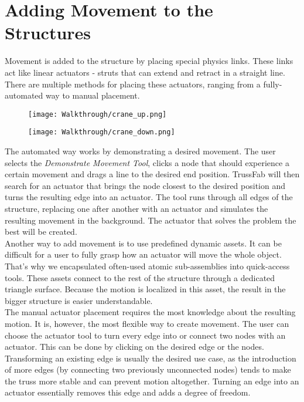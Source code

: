 \section{Adding Movement to the Structures}
Movement is added to the structure by placing special physics links. These links act like linear actuators - struts that can extend and retract in a straight line. There are multiple methods for placing these actuators, ranging from a fully-automated way to manual placement.
\begin{figure}
  \centering
  \begin{minipage}{.5\textwidth}
    \centering
    \texttt{[image: Walkthrough/crane\_up.png]}
    \label{fig:dino_up}
  \end{minipage}%
  \begin{minipage}{.5\textwidth}
    \centering
    \texttt{[image: Walkthrough/crane\_down.png]}
    \label{fig:dino_down}
  \end{minipage}
\end{figure}
The automated way works by demonstrating a desired movement. The user selects the \textit{Demonstrate Movement Tool}, clicks a node that should experience a certain movement and drags a line to the desired end position. TrussFab will then search for an actuator that brings the node closest to the desired position and turns the resulting edge into an actuator. The tool runs through all edges of the structure, replacing one after another with an actuator and simulates the resulting movement in the background. The actuator that solves the problem the best will be created.\\
Another way to add movement is to use predefined dynamic assets. It can be difficult for a user to fully grasp how an actuator will move the whole object. That's why we encapsulated often-used atomic sub-assemblies into quick-access tools. These assets connect to the rest of the structure through a dedicated triangle surface. Because the motion is localized in this asset, the result in the bigger structure is easier understandable.\\
The manual actuator placement requires the most knowledge about the resulting motion. It is, however, the most flexible way to create movement. The user can choose the actuator tool to turn every edge into or connect two nodes with an actuator. This can be done by clicking on the desired edge or the nodes. Transforming an existing edge is usually the desired use case, as the introduction of more edges (by connecting two previously unconnected nodes) tends to make the truss more stable and can prevent motion altogether. Turning an edge into an actuator essentially removes this edge and adds a degree of freedom.\\
